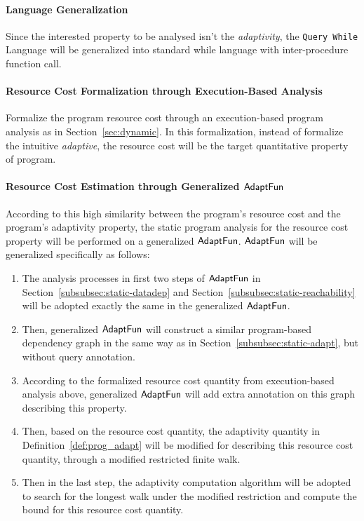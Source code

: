\paragraph*{Language Generalization} Since the interested property 
to be analysed isn't the \emph{adaptivity},
the {\tt Query While} Language will be generalized into standard while language with inter-procedure function call.
\paragraph*{Resource Cost Formalization through Execution-Based Analysis} 
Formalize the program resource cost through an execution-based program analysis as in Section~\ref{sec:dynamic}.
In this formalization, instead of formalize the intuitive \emph{adaptive}, the resource cost will be the
target quantitative property of program.
\\
\paragraph*{Resource Cost Estimation through Generalized $\textsf{AdaptFun}$}
According to this high similarity between the program's resource cost and the 
program's adaptivity property, the static program analysis for the resource cost property will 
be performed on a generalized  $\textsf{AdaptFun}$.  $\textsf{AdaptFun}$ will be generalized specifically as follows:
\\
\begin{enumerate}
    \item The analysis processes in first two steps of $\textsf{AdaptFun}$ in Section~\ref{subsubsec:static-datadep}
    and Section~\ref{subsubsec:static-reachability} will be adopted exactly the same in the generalized $\textsf{AdaptFun}$.
    \item Then, generalized $\textsf{AdaptFun}$ will construct a similar program-based dependency graph 
    in the same way as in Section~\ref*{subsubsec:static-adapt}, but without query annotation. 
    \item According to the formalized resource cost quantity from execution-based analysis above,
    generalized $\textsf{AdaptFun}$ will add extra annotation on this graph describing this property.
    \item Then, based on the resource cost quantity, the adaptivity quantity in Definition~\ref{def:prog_adapt}
    will be modified for describing this resource cost quantity, through a modified restricted finite walk.
    \item Then in the last step, the adaptivity computation algorithm will be adopted to search for the longest 
    walk under the modified restriction and compute the bound for 
    this resource cost quantity.
\end{enumerate}


